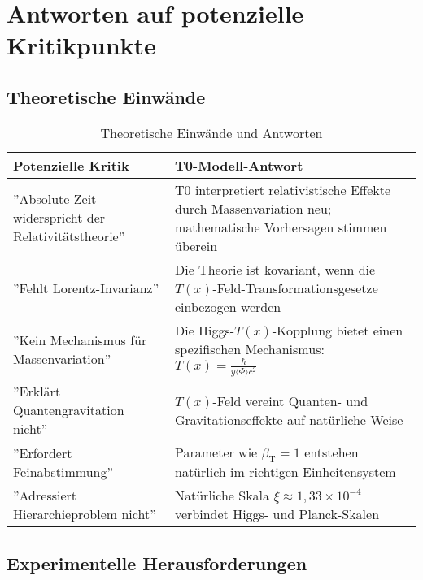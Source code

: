 \documentclass[12pt,a4paper]{article}
\newcommand{\Tfield}{T(x)}
\newcommand{\betaT}{\beta_{\text{T}}}
\begin{document}
	\section{Antworten auf potenzielle Kritikpunkte}
	
	\subsection{Theoretische Einwände}
	
	\begin{table}[h]
		\centering
		\begin{tabular}{>{\RaggedRight}p{} >{\RaggedRight}p{}}
			\toprule
			\textbf{Potenzielle Kritik} & \textbf{T0-Modell-Antwort} \\
			\midrule
			''Absolute Zeit widerspricht der Relativitätstheorie'' & T0 interpretiert relativistische Effekte durch Massenvariation neu; mathematische Vorhersagen stimmen überein \\
			''Fehlt Lorentz-Invarianz'' & Die Theorie ist kovariant, wenn die $\Tfield$-Feld-Transformationsgesetze einbezogen werden \\
			''Kein Mechanismus für Massenvariation'' & Die Higgs-$\Tfield$-Kopplung bietet einen spezifischen Mechanismus: $\Tfield = \frac{\hbar}{y \langle \Phi \rangle c^2}$ \\
			''Erklärt Quantengravitation nicht'' & $\Tfield$-Feld vereint Quanten- und Gravitationseffekte auf natürliche Weise \\
			''Erfordert Feinabstimmung'' & Parameter wie $\betaT = 1$ entstehen natürlich im richtigen Einheitensystem \\
			''Adressiert Hierarchieproblem nicht'' & Natürliche Skala $\xi \approx 1,33 \times 10^{-4}$ verbindet Higgs- und Planck-Skalen \\
			\bottomrule
		\end{tabular}
		\caption{Theoretische Einwände und Antworten}
	\end{table}
	
	\subsection{Experimentelle Herausforderungen}
	
\end{document}

